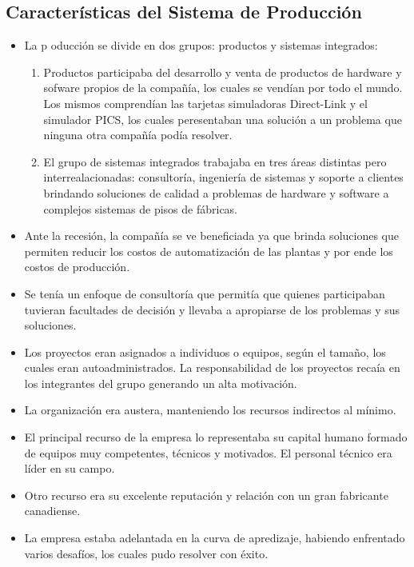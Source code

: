 \documentclass[12pt,a4paper,spanish]{article}
\begin{document}
\subsection{Caracter\'{i}sticas del Sistema de Producci\'{o}n}
\begin{itemize}
	\item La p oducci\'{o}n se divide en dos grupos: productos y sistemas integrados:
	\begin{enumerate}
		\item Productos participaba del desarrollo y venta de productos de hardware y sofware propios de la compa\~{n}\'{i}a, los cuales se vend\'{i}an por todo el mundo. Los mismos comprend\'{i}an las tarjetas simuladoras Direct-Link y el simulador PICS, los cuales peresentaban una soluci\'{o}n a un problema que ninguna otra compa\~{n}\'{i}a pod\'{i}a resolver.
		\item El grupo de sistemas integrados trabajaba en tres \'{a}reas distintas pero interrealacionadas: consultor\'{i}a, ingenier\'{i}a de sistemas y soporte a clientes brindando soluciones de calidad a problemas de hardware y software a complejos sistemas de pisos de f\'{a}bricas.
		\end{enumerate} 
	\item Ante la recesi\'{o}n, la compa\~{n}\'{i}a se ve beneficiada ya que brinda soluciones que permiten reducir los costos de automatizaci\'{o}n de las plantas y por ende los costos de producci\'{o}n.
	\item Se ten\'{i}a un enfoque de consultor\'{i}a que permit\'{i}a que quienes participaban tuvieran facultades de decisi\'{o}n y llevaba a apropiarse de los problemas y sus soluciones.
	\item Los proyectos eran asignados a individuos o equipos, seg\'{u}n el tama\~{n}o, los cuales eran autoadministrados. La responsabilidad de los proyectos reca\'{i}a en los integrantes del grupo generando un alta motivaci\'{o}n.
	\item La organizaci\'{o}n era austera, manteniendo los recursos indirectos al m\'{i}nimo.
	\item El principal recurso de la empresa lo representaba su capital humano formado de equipos muy competentes, t\'{e}cnicos y motivados. El personal t\'{e}cnico era l\'{i}der en su campo.
	\item Otro recurso era su excelente reputaci\'{o}n y relaci\'{o}n con un gran fabricante canadiense.
	\item La empresa estaba adelantada en la curva de apredizaje, habiendo enfrentado varios desaf\'{i}os, los cuales pudo resolver con \'{e}xito.
\end{itemize}
\end{document}
